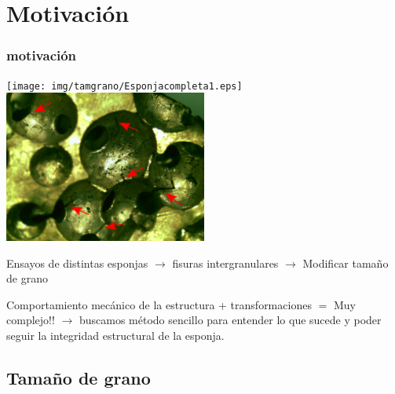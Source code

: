 \documentclass[usenames,dvipsnames]{beamer}
\begin{document}




\section{Motivación}

\begin{frame}
\frametitle{motivación}


\begin{center}

\texttt{[image: img/tamgrano/Esponjacompleta1.eps]}
\includegraphics[width=0.5\textwidth]{img/tamgrano/Fisuras.eps}

\end{center}

\alert<1>{Ensayos de distintas esponjas} $\rightarrow$ \alert<2>{fisuras intergranulares} $\rightarrow$ \alert<3>{Modificar tamaño de grano}
 
\alert<4>{Comportamiento mecánico de la estructura + transformaciones $=$ Muy complejo!!} $\rightarrow$ \alert<5>{buscamos método sencillo para entender lo que sucede y poder seguir la integridad estructural de la esponja.} 
\end{frame}


\subsection{Tamaño de grano}


\end{document}
